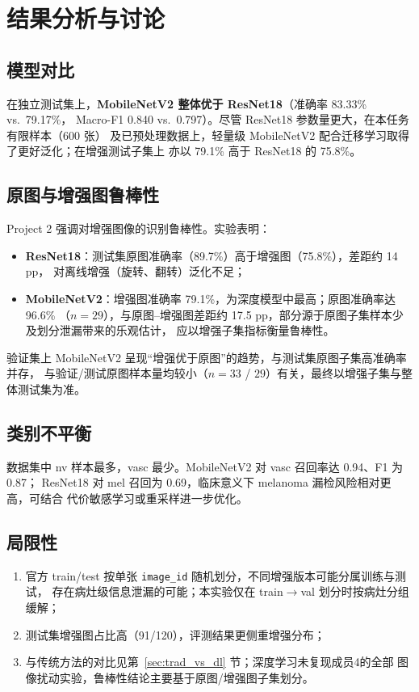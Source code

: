 \documentclass[12pt,a4paper]{ctexart}
\begin{document}
\section{结果分析与讨论}

\subsection{模型对比}
在独立测试集上，\textbf{MobileNetV2 整体优于 ResNet18}（准确率 83.33\% vs.\ 79.17\%，
Macro-F1 0.840 vs.\ 0.797）。尽管 ResNet18 参数量更大，在本任务有限样本（600 张）
及已预处理数据上，轻量级 MobileNetV2 配合迁移学习取得了更好泛化；在增强测试子集上
亦以 79.1\% 高于 ResNet18 的 75.8\%。

\subsection{原图与增强图鲁棒性}
Project 2 强调对增强图像的识别鲁棒性。实验表明：
\begin{itemize}
  \item \textbf{ResNet18}：测试集原图准确率（89.7\%）高于增强图（75.8\%），差距约 14 pp，
  对离线增强（旋转、翻转）泛化不足；
  \item \textbf{MobileNetV2}：增强图准确率 79.1\%，为深度模型中最高；原图准确率达 96.6\%
  （$n{=}29$），与原图--增强图差距约 17.5 pp，部分源于原图子集样本少及划分泄漏带来的乐观估计，
  应以增强子集指标衡量鲁棒性。
\end{itemize}

验证集上 MobileNetV2 呈现“增强优于原图”的趋势，与测试集原图子集高准确率并存，
与验证/测试原图样本量均较小（$n{=}33$ / $29$）有关，最终以增强子集与整体测试集为准。

\subsection{类别不平衡}
数据集中 nv 样本最多，vasc 最少。MobileNetV2 对 vasc 召回率达 0.94、F1 为 0.87；
ResNet18 对 mel 召回为 0.69，临床意义下 melanoma 漏检风险相对更高，可结合
代价敏感学习或重采样进一步优化。

\subsection{局限性}
\begin{enumerate}
  \item 官方 train/test 按单张 \texttt{image\_id} 随机划分，不同增强版本可能分属训练与测试，
  存在病灶级信息泄漏的可能；本实验仅在 train$\rightarrow$val 划分时按病灶分组缓解；
  \item 测试集增强图占比高（91/120），评测结果更侧重增强分布；
  \item 与传统方法的对比见第~\ref{sec:trad_vs_dl} 节；深度学习未复现成员4的全部
  图像扰动实验，鲁棒性结论主要基于原图/增强图子集划分。
\end{enumerate}
\end{document}
